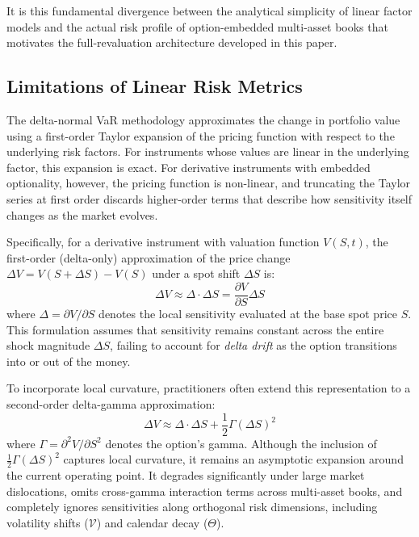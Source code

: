 \documentclass{article}
\theoremstyle{plain}
\theoremstyle{definition}
\theoremstyle{remark}
\begin{document}
It is this fundamental divergence between the analytical simplicity of linear factor models and the actual risk profile of option-embedded multi-asset books that motivates the full-revaluation architecture developed in this paper.

\subsection{Limitations of Linear Risk Metrics}
The delta-normal VaR methodology approximates the change in portfolio value using a first-order Taylor expansion of the pricing function with respect to the underlying risk factors. For instruments whose values are linear in the underlying factor, this expansion is exact. For derivative instruments with embedded optionality, however, the pricing function is non-linear, and truncating the Taylor series at first order discards higher-order terms that describe how sensitivity itself changes as the market evolves.

Specifically, for a derivative instrument with valuation function $V(S, t)$, the first-order (delta-only) approximation of the price change $\Delta V = V(S + \Delta S) - V(S)$ under a spot shift $\Delta S$ is:
\begin{equation}
    \Delta V \approx \Delta \cdot \Delta S = \frac{\partial V}{\partial S} \Delta S
\end{equation}
where $\Delta = \partial V / \partial S$ denotes the local sensitivity evaluated at the base spot price $S$. This formulation assumes that sensitivity remains constant across the entire shock magnitude $\Delta S$, failing to account for \textit{delta drift} as the option transitions into or out of the money.

To incorporate local curvature, practitioners often extend this representation to a second-order delta-gamma approximation:
\begin{equation}
    \Delta V \approx \Delta \cdot \Delta S + \frac{1}{2}\Gamma (\Delta S)^2
\end{equation}
where $\Gamma = \partial^2 V / \partial S^2$ denotes the option's gamma. Although the inclusion of $\frac{1}{2}\Gamma (\Delta S)^2$ captures local curvature, it remains an asymptotic expansion around the current operating point. It degrades significantly under large market dislocations, omits cross-gamma interaction terms across multi-asset books, and completely ignores sensitivities along orthogonal risk dimensions, including volatility shifts ($\mathcal{V}$) and calendar decay ($\Theta$).
\end{document}
